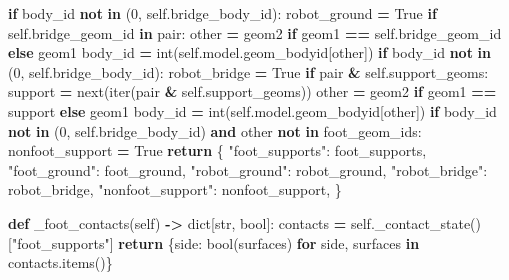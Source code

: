 \documentclass[
  chinese,
  11pt,
  letterpaper,
]{article}
\newenvironment{Shaded}{\begin{snugshade}}{\end{snugshade}}
\newcommand{\BuiltInTok}[1]{#1}
\newcommand{\ControlFlowTok}[1]{\textcolor[rgb]{0.13,0.29,0.53}{\textbf{#1}}}
\newcommand{\DecValTok}[1]{\textcolor[rgb]{0.00,0.00,0.81}{#1}}
\newcommand{\KeywordTok}[1]{\textcolor[rgb]{0.13,0.29,0.53}{\textbf{#1}}}
\newcommand{\NormalTok}[1]{#1}
\newcommand{\OperatorTok}[1]{\textcolor[rgb]{0.81,0.36,0.00}{\textbf{#1}}}
\newcommand{\StringTok}[1]{\textcolor[rgb]{0.31,0.60,0.02}{#1}}
\newcommand{\VariableTok}[1]{\textcolor[rgb]{0.00,0.00,0.00}{#1}}
\renewenvironment{Shaded}{\par\smallskip}{\par\smallskip}
\begin{document}
\begin{Shaded}
\begin{Highlighting}[]
                \ControlFlowTok{if}\NormalTok{ body\_id }\KeywordTok{not} \KeywordTok{in}\NormalTok{ (}\DecValTok{0}\NormalTok{, }\VariableTok{self}\NormalTok{.bridge\_body\_id):}
\NormalTok{                    robot\_ground }\OperatorTok{=} \VariableTok{True}
            \ControlFlowTok{if} \VariableTok{self}\NormalTok{.bridge\_geom\_id }\KeywordTok{in}\NormalTok{ pair:}
\NormalTok{                other }\OperatorTok{=}\NormalTok{ geom2 }\ControlFlowTok{if}\NormalTok{ geom1 }\OperatorTok{==} \VariableTok{self}\NormalTok{.bridge\_geom\_id }\ControlFlowTok{else}\NormalTok{ geom1}
\NormalTok{                body\_id }\OperatorTok{=} \BuiltInTok{int}\NormalTok{(}\VariableTok{self}\NormalTok{.model.geom\_bodyid[other])}
                \ControlFlowTok{if}\NormalTok{ body\_id }\KeywordTok{not} \KeywordTok{in}\NormalTok{ (}\DecValTok{0}\NormalTok{, }\VariableTok{self}\NormalTok{.bridge\_body\_id):}
\NormalTok{                    robot\_bridge }\OperatorTok{=} \VariableTok{True}
            \ControlFlowTok{if}\NormalTok{ pair }\OperatorTok{\&} \VariableTok{self}\NormalTok{.support\_geoms:}
\NormalTok{                support }\OperatorTok{=} \BuiltInTok{next}\NormalTok{(}\BuiltInTok{iter}\NormalTok{(pair }\OperatorTok{\&} \VariableTok{self}\NormalTok{.support\_geoms))}
\NormalTok{                other }\OperatorTok{=}\NormalTok{ geom2 }\ControlFlowTok{if}\NormalTok{ geom1 }\OperatorTok{==}\NormalTok{ support }\ControlFlowTok{else}\NormalTok{ geom1}
\NormalTok{                body\_id }\OperatorTok{=} \BuiltInTok{int}\NormalTok{(}\VariableTok{self}\NormalTok{.model.geom\_bodyid[other])}
                \ControlFlowTok{if}\NormalTok{ body\_id }\KeywordTok{not} \KeywordTok{in}\NormalTok{ (}\DecValTok{0}\NormalTok{, }\VariableTok{self}\NormalTok{.bridge\_body\_id) }\KeywordTok{and}\NormalTok{ other }\KeywordTok{not} \KeywordTok{in}\NormalTok{ foot\_geom\_ids:}
\NormalTok{                    nonfoot\_support }\OperatorTok{=} \VariableTok{True}
        \ControlFlowTok{return}\NormalTok{ \{}
            \StringTok{"foot\_supports"}\NormalTok{: foot\_supports,}
            \StringTok{"foot\_ground"}\NormalTok{: foot\_ground,}
            \StringTok{"robot\_ground"}\NormalTok{: robot\_ground,}
            \StringTok{"robot\_bridge"}\NormalTok{: robot\_bridge,}
            \StringTok{"nonfoot\_support"}\NormalTok{: nonfoot\_support,}
\NormalTok{        \}}

    \KeywordTok{def}\NormalTok{ \_foot\_contacts(}\VariableTok{self}\NormalTok{) }\OperatorTok{{-}\textgreater{}} \BuiltInTok{dict}\NormalTok{[}\BuiltInTok{str}\NormalTok{, }\BuiltInTok{bool}\NormalTok{]:}
\NormalTok{        contacts }\OperatorTok{=} \VariableTok{self}\NormalTok{.\_contact\_state()[}\StringTok{"foot\_supports"}\NormalTok{]}
        \ControlFlowTok{return}\NormalTok{ \{side: }\BuiltInTok{bool}\NormalTok{(surfaces) }\ControlFlowTok{for}\NormalTok{ side, surfaces }\KeywordTok{in}\NormalTok{ contacts.items()\}}


\end{Highlighting}
\end{Shaded}
\end{document}
